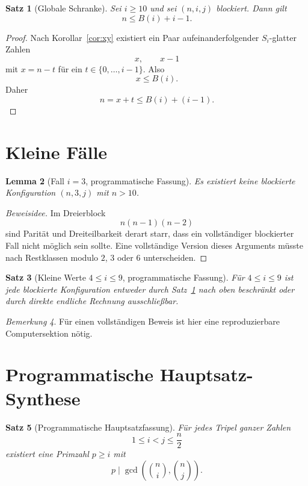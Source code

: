 \documentclass[12pt,a4paper]{article}
\theoremstyle{plain}
\newtheorem{theorem}{Satz}[section]
\newtheorem{lemma}[theorem]{Lemma}
\theoremstyle{definition}
\theoremstyle{remark}
\newtheorem{remark}[theorem]{Bemerkung}
\begin{document}
	\begin{theorem}[Globale Schranke]
		\label{thm:global-bound}
		Sei \(i\ge10\) und sei \((n,i,j)\) blockiert. Dann gilt
		\[
		n\le B(i)+i-1.
		\]
	\end{theorem}
	
	\begin{proof}
		Nach Korollar~\ref{cor:xy} existiert ein Paar aufeinanderfolgender \(S_i\)-glatter Zahlen
		\[
		x,\qquad x-1
		\]
		mit \(x=n-t\) für ein \(t\in\{0,\dots,i-1\}\). Also
		\[
		x\le B(i).
		\]
		Daher
		\[
		n=x+t\le B(i)+(i-1).
		\]
	\end{proof}
	
	\section{Kleine Fälle}
	
	\begin{lemma}[Fall \(i=3\), programmatische Fassung]
		\label{lem:i3}
		Es existiert keine blockierte Konfiguration \((n,3,j)\) mit \(n>10\).
	\end{lemma}
	
	\begin{proof}[Beweisidee]
		Im Dreierblock
		\[
		n(n-1)(n-2)
		\]
		sind Parität und Dreiteilbarkeit derart starr, dass ein vollständiger blockierter Fall nicht möglich sein sollte. Eine vollständige Version dieses Arguments müsste nach Restklassen modulo \(2\), \(3\) oder \(6\) unterscheiden.
	\end{proof}
	
	\begin{theorem}[Kleine Werte \(4\le i\le9\), programmatische Fassung]
		Für \(4\le i\le9\) ist jede blockierte Konfiguration entweder durch Satz~\ref{thm:global-bound} nach oben beschränkt oder durch direkte endliche Rechnung ausschließbar.
	\end{theorem}
	
	\begin{remark}
		Für einen vollständigen Beweis ist hier eine reproduzierbare Computersektion nötig.
	\end{remark}
	
	\section{Programmatische Hauptsatz-Synthese}
	
	\begin{theorem}[Programmatische Hauptsatzfassung]
		\label{thm:programmatic-main}
		Für jedes Tripel ganzer Zahlen
		\[
		1\le i<j\le \frac n2
		\]
		existiert eine Primzahl \(p\ge i\) mit
		\[
		p\mid \gcd\!\left(\binom ni,\binom nj\right).
		\]
	\end{theorem}
	
\end{document}
